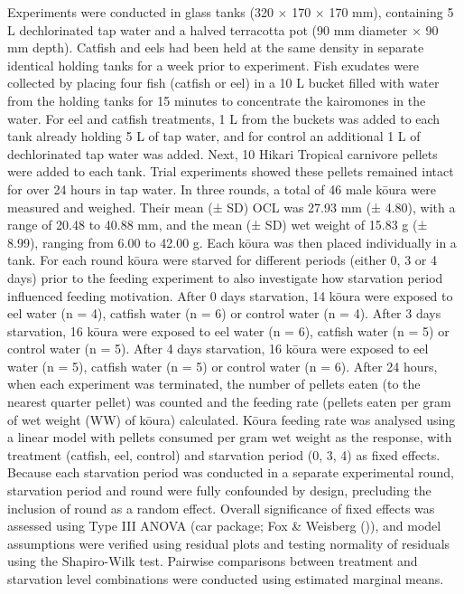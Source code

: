 \documentclass[
  letterpaper,
  DIV=11,
  numbers=noendperiod]{scrartcl}
\begin{document}
Experiments were conducted in glass tanks (320 × 170 × 170 mm),
containing 5 L dechlorinated tap water and a halved terracotta pot (90
mm diameter × 90 mm depth). Catfish and eels had been held at the same
density in separate identical holding tanks for a week prior to
experiment. Fish exudates were collected by placing four fish (catfish
or eel) in a 10 L bucket filled with water from the holding tanks for 15
minutes to concentrate the kairomones in the water. For eel and catfish
treatments, 1 L from the buckets was added to each tank already holding
5 L of tap water, and for control an additional 1 L of dechlorinated tap
water was added. Next, 10 Hikari Tropical carnivore pellets were added
to each tank. Trial experiments showed these pellets remained intact for
over 24 hours in tap water. In three rounds, a total of 46 male kōura
were measured and weighed. Their mean (± SD) OCL was 27.93 mm (± 4.80),
with a range of 20.48 to 40.88 mm, and the mean (± SD) wet weight of
15.83 g (± 8.99), ranging from 6.00 to 42.00 g. Each kōura was then
placed individually in a tank. For each round kōura were starved for
different periods (either 0, 3 or 4 days) prior to the feeding
experiment to also investigate how starvation period influenced feeding
motivation. After 0 days starvation, 14 kōura were exposed to eel water
(n = 4), catfish water (n = 6) or control water (n = 4). After 3 days
starvation, 16 kōura were exposed to eel water (n = 6), catfish water (n
= 5) or control water (n = 5). After 4 days starvation, 16 kōura were
exposed to eel water (n = 5), catfish water (n = 5) or control water (n
= 6). After 24 hours, when each experiment was terminated, the number of
pellets eaten (to the nearest quarter pellet) was counted and the
feeding rate (pellets eaten per gram of wet weight (WW) of kōura)
calculated. Kōura feeding rate was analysed using a linear model with
pellets consumed per gram wet weight as the response, with treatment
(catfish, eel, control) and starvation period (0, 3, 4) as fixed
effects. Because each starvation period was conducted in a separate
experimental round, starvation period and round were fully confounded by
design, precluding the inclusion of round as a random effect. Overall
significance of fixed effects was assessed using Type III ANOVA (car
package; Fox \& Weisberg ()), and model
assumptions were verified using residual plots and testing normality of
residuals using the Shapiro-Wilk test. Pairwise comparisons between
treatment and starvation level combinations were conducted using
estimated marginal means.
\end{document}
